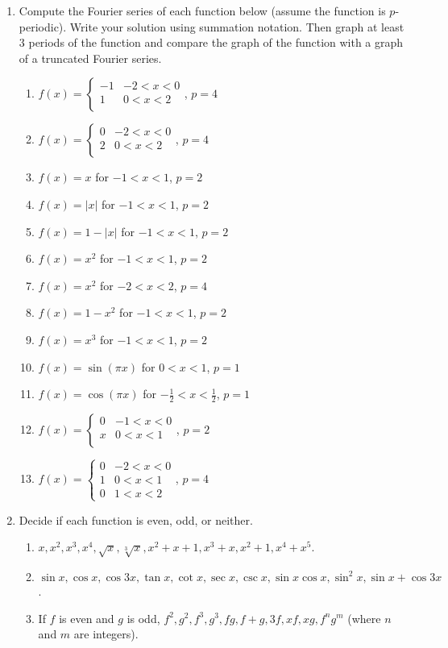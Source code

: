 \begin{enumerate}
	\item Compute the Fourier series of each function below (assume the function is $p$-periodic). Write your solution using summation notation. Then graph at least 3 periods of the function and compare the graph of the function with a graph of a truncated Fourier series.
	\begin{multicols}{2}
\begin{enumerate}
	\item $f(x) = 
	\begin{cases}
	-1 & -2<x<0\\
	1 & 0<x<2\\
	\end{cases}$, $p=4$
	\item $f(x) = 
	\begin{cases}
	0 & -2<x<0\\
	2 & 0<x<2\\
	\end{cases}$, $p=4$
	\item $f(x) =x $ for $-1<x<1$, $p=2$
	\item $f(x) =|x| $ for $-1<x<1$, $p=2$
	\item $f(x) =1-|x| $ for $-1<x<1$, $p=2$
	\item $f(x) =x^2 $ for $-1<x<1$, $p=2$
	\item $f(x) =x^2 $ for $-2<x<2$, $p=4$
	\item $f(x) =1-x^2 $ for $-1<x<1$, $p=2$
	\item $f(x) =x^3 $ for $-1<x<1$, $p=2$
	\item $f(x) =\sin(\pi x) $ for $0<x<1$, $p=1$
	\item $f(x) =\cos(\pi x) $ for $-\frac12<x<\frac12$, $p=1$
	\item $f(x) = 
	\begin{cases}
	0 & -1<x<0\\
	x & 0<x<1\\
	\end{cases}$, $p=2$
	\item $f(x) = 
	\begin{cases}
	0 & -2<x<0\\
	1 & 0<x<1\\
	0 & 1<x<2
	\end{cases}$, $p=4$
\end{enumerate}
	\end{multicols}
	
	
	\item Decide if each function is even, odd, or neither.	
\begin{enumerate}
	\item $x,x^2,x^3,x^4,\sqrt{x},\sqrt[3]{x}, x^2+x+1, x^3+x, x^2+1, x^4+x^5$.
	\item $\sin x, \cos x,\cos 3x, \tan x, \cot x, \sec x, \csc x, \sin x \cos x, \sin^2 x, \sin x+\cos 3x$.
	\item If $f$ is even and $g$ is odd, $f^2, g^2, f^3, g^3, fg, f+g, 3f, xf, xg,f^ng^m$ (where $n$ and $m$ are integers).
\end{enumerate}


\end{enumerate}
